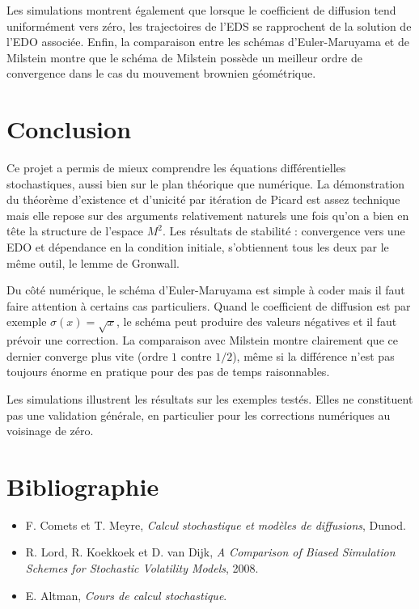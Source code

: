 \documentclass[12pt,a4paper]{article}
\theoremstyle{remark}
\begin{document}
Les simulations montrent également que lorsque le coefficient de diffusion tend uniformément vers zéro, les trajectoires de l’EDS se rapprochent de la solution de l’EDO associée. Enfin, la comparaison entre les schémas d’Euler-Maruyama et de Milstein montre que le schéma de Milstein possède un meilleur ordre de convergence dans le cas du mouvement brownien géométrique.

\section*{Conclusion}

Ce projet a permis de mieux comprendre les équations différentielles stochastiques, aussi bien sur le plan théorique que numérique. La démonstration du théorème d'existence et d'unicité par itération de Picard est assez technique mais elle repose sur des arguments relativement naturels une fois qu'on a bien en tête la structure de l'espace $M^2$. Les résultats de stabilité : convergence vers une EDO et dépendance en la condition initiale, s'obtiennent tous les deux par le même outil, le lemme de Gronwall.

Du côté numérique, le schéma d'Euler-Maruyama est simple à coder mais il faut faire attention à certains cas particuliers. Quand le coefficient de diffusion est par exemple $\sigma(x)=\sqrt{x}$, le schéma peut produire des valeurs négatives et il faut prévoir une correction. La comparaison avec Milstein montre clairement que ce dernier converge plus vite (ordre $1$ contre $1/2$), même si la différence n'est pas toujours énorme en pratique pour des pas de temps raisonnables.

Les simulations illustrent les résultats sur les exemples testés. Elles ne constituent pas une validation générale, en particulier pour les corrections numériques au voisinage de zéro.

\section*{Bibliographie}

\begin{itemize}
    \item F. Comets et T. Meyre, \textit{Calcul stochastique et modèles de diffusions}, Dunod.

    \item R. Lord, R. Koekkoek et D. van Dijk, \textit{A Comparison of Biased Simulation Schemes for Stochastic Volatility Models}, 2008.

    \item E. Altman, \textit{Cours de calcul stochastique}.
\end{itemize}
\end{document}

